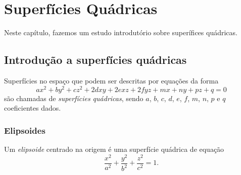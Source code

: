 

\chapter{Superfícies Quádricas}\label{cap_superquad}
\thispagestyle{fancy}

Neste capítulo, fazemos um estudo introdutório sobre superífices quádricas.

\section{Introdução a superfícies quádricas}\label{cap_superquad_sec_intro}

Superfícies no espaço que podem ser descritas por equações da forma
\begin{equation}
  ax^2 + by^2 + cz^2 + 2dxy + 2exz + 2fyz + mx + ny + pz + q = 0
\end{equation}
são chamadas de \emph{superfícies quádricas}, sendo $a$, $b$, $c$, $d$, $e$, $f$, $m$, $n$, $p$ e $q$ coeficientes dados.

\subsection{Elipsoides}

Um \emph{elipsoide} centrado na origem é uma superfície quádrica de equação
\begin{equation}
  \frac{x^2}{a^2} + \frac{y^2}{b^2} + \frac{z^2}{c^2} = 1.
\end{equation}

